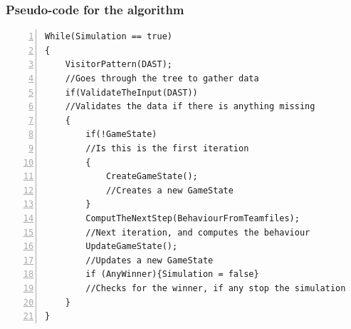 \subsubsection{Pseudo-code for the algorithm}
		\begin{lstlisting}[basicstyle=\small\sffamily,
		keywords={break,case,const,continue,default,else,enum,
		for,if,return,switch,while,do,long,void,int,float,double,
		char,struct,typedef,include,size\_t},
		keywordstyle={\color{blue}},
		comment={[l]{//}}, morecomment={[s]{/*}{*/}}, commentstyle=\itshape,
		columns={[l]flexible}, numbers=left, numberstyle=\tiny,
		frameround=fftt, frame=shadowbox, captionpos=b,
		caption={Team file},
		label=LST:code31]
While(Simulation == true)
{
	VisitorPattern(DAST); 		
	//Goes through the tree to gather data
	if(ValidateTheInput(DAST))	
	//Validates the data if there is anything missing
	{
		if(!GameState)			
		//Is this is the first iteration
		{
			CreateGameState(); 	
			//Creates a new GameState
		}
		ComputTheNextStep(BehaviourFromTeamfiles); 	
		//Next iteration, and computes the behaviour
		UpdateGameState();		
		//Updates a new GameState
		if (AnyWinner){Simulation = false}	
		//Checks for the winner, if any stop the simulation
	}
}
	\end{lstlisting}











